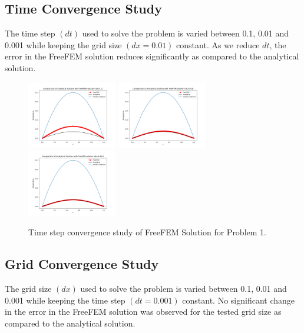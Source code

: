 \documentclass[11pt]{article} %
\begin{document}
\subsection{Time Convergence Study}
The time step $(dt)$ used to solve the problem is varied between 0.1, 0.01 and 0.001 while keeping the grid size $(dx=0.01)$ constant. As we reduce $dt$, the error in the FreeFEM solution reduces significantly as compared to the analytical solution.

\begin{figure}[H]
\centering
\includegraphics[width=0.35\textwidth]{figures/p121.png}
\includegraphics[width=0.35\textwidth]{figures/p1201.png}
\includegraphics[width=0.35\textwidth]{figures/p12001.png}
\caption{Time step convergence study of FreeFEM Solution for Problem 1.}
\end{figure}

\subsection{Grid Convergence Study}
The grid size $(dx)$ used to solve the problem is varied between 0.1, 0.01 and 0.001 while keeping the time step $(dt=0.001)$ constant. No significant change in the error in the FreeFEM solution was observed for the tested grid size as compared to the analytical solution.
\end{document}
